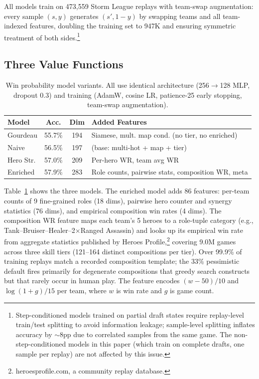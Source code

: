 \documentclass[conference]{IEEEtran}
\begin{document}
All models train on 473,559 Storm League replays with team-swap augmentation: every sample $(s, y)$ generates $(s', 1\!-\!y)$ by swapping teams and all team-indexed features, doubling the training set to 947K and ensuring symmetric treatment of both sides.\footnote{Step-conditioned models trained on partial draft states require replay-level train/test splitting to avoid information leakage; sample-level splitting inflates accuracy by $\sim$8pp due to correlated samples from the same game. The non-step-conditioned models in this paper (which train on complete drafts, one sample per replay) are not affected by this issue.}

\subsection{Three Value Functions}

\begin{table}[t]
\centering
\caption{Win probability model variants. All use identical architecture (256$\to$128 MLP, dropout 0.3) and training (AdamW, cosine LR, patience-25 early stopping, team-swap augmentation).}
\label{tab:models}
\begin{tabular}{lccp{3.1cm}}
\toprule
Model & Acc. & Dim & Added Features \\
\midrule
Gourdeau & 55.7\% & 194 & Siamese, mult. map cond. (no tier, no enriched) \\
Naive & 56.5\% & 197 & (base: multi-hot + map + tier) \\
Hero Str. & 57.0\% & 209 & Per-hero WR, team avg WR \\
Enriched & 57.9\% & 283 & Role counts, pairwise stats, composition WR, meta \\
\bottomrule
\end{tabular}
\end{table}

Table~\ref{tab:models} shows the three models. The enriched model adds 86 features: per-team counts of 9 fine-grained roles (18 dims), pairwise hero counter and synergy statistics (76 dims), and empirical composition win rates (4 dims). The composition WR feature maps each team's 5 heroes to a role-tuple category (e.g., Tank--Bruiser--Healer--2$\times$Ranged Assassin) and looks up its empirical win rate from aggregate statistics published by Heroes Profile,\footnote{heroesprofile.com, a community replay database.} covering 9.0M games across three skill tiers (121--164 distinct compositions per tier). Over 99.9\% of training replays match a recorded composition template; the 33\% pessimistic default fires primarily for degenerate compositions that greedy search constructs but that rarely occur in human play. The feature encodes $(w\!-\!50)/10$ and $\log(1\!+\!g)/15$ per team, where $w$ is win rate and $g$ is game count.
\end{document}
